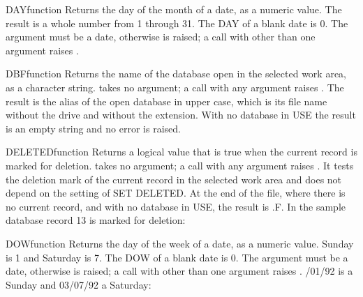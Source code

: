 \begin{XbaseEntry}{DAY}{function}
Returns the day of the month of a date, as a numeric value.
\Syntax
{}
\Usage
The result is a whole number from 1 through 31. The DAY of a blank date is 0. The argument must be a date, otherwise  is raised; a call with other than one argument raises .
\Examples
{}
\end{XbaseEntry}

\begin{XbaseEntry}{DBF}{function}
Returns the name of the database open in the selected work area, as a character string.
\Syntax
{}
\Usage
{} takes no argument; a call with any argument raises . The result is the alias of the open database in upper case, which is its file name without the drive and without the extension. With no database in USE the result is an empty string and no error is raised.
\Examples
{}
\end{XbaseEntry}

\begin{XbaseEntry}{DELETED}{function}
Returns a logical value that is true when the current record is marked for deletion.
\Syntax
{}
\Usage
{} takes no argument; a call with any argument raises . It tests the deletion mark of the current record in the selected work area and does not depend on the setting of SET DELETED. At the end of the file, where there is no current record, and with no database in USE, the result is .F.
\Examples
In the sample database record 13 is marked for deletion:
\end{XbaseEntry}

\begin{XbaseEntry}{DOW}{function}
Returns the day of the week of a date, as a numeric value.
\Syntax
{}
\Usage
Sunday is 1 and Saturday is 7. The DOW of a blank date is 0. The argument must be a date, otherwise  is raised; a call with other than one argument raises .
/01/92 is a Sunday and 03/07/92 a Saturday:
\end{XbaseEntry}

